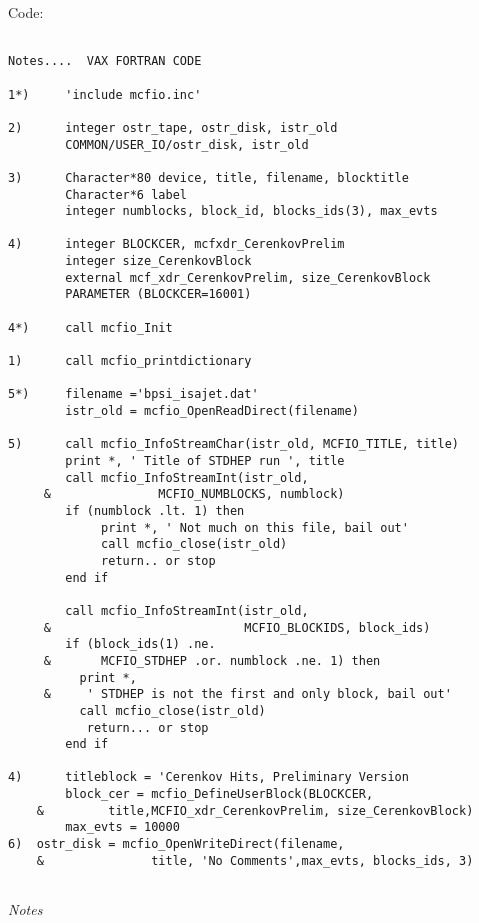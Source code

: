 \vspace{.1in} 
 Code:
\begin{verbatim}

Notes....  VAX FORTRAN CODE

1*) 	'include mcfio.inc'

2)      integer ostr_tape, ostr_disk, istr_old
        COMMON/USER_IO/ostr_disk, istr_old 
	
3)      Character*80 device, title, filename, blocktitle
        Character*6 label  
        integer numblocks, block_id, blocks_ids(3), max_evts
	
4)      integer BLOCKCER, mcfxdr_CerenkovPrelim
        integer size_CerenkovBlock 
        external mcf_xdr_CerenkovPrelim, size_CerenkovBlock
        PARAMETER (BLOCKCER=16001) 	
	
4*)     call mcfio_Init

1)      call mcfio_printdictionary

5*)     filename ='bpsi_isajet.dat'
        istr_old = mcfio_OpenReadDirect(filename)
	
5)      call mcfio_InfoStreamChar(istr_old, MCFIO_TITLE, title)
        print *, ' Title of STDHEP run ', title
        call mcfio_InfoStreamInt(istr_old, 
     &               MCFIO_NUMBLOCKS, numblock)
        if (numblock .lt. 1) then 
             print *, ' Not much on this file, bail out'
             call mcfio_close(istr_old)
             return.. or stop 
        end if
	
        call mcfio_InfoStreamInt(istr_old,
     &                           MCFIO_BLOCKIDS, block_ids)
        if (block_ids(1) .ne.
     &       MCFIO_STDHEP .or. numblock .ne. 1) then  
          print *,
     &     ' STDHEP is not the first and only block, bail out'
          call mcfio_close(istr_old)
           return... or stop 
        end if
		
4)      titleblock = 'Cerenkov Hits, Preliminary Version
        block_cer = mcfio_DefineUserBlock(BLOCKCER, 
    &         title,MCFIO_xdr_CerenkovPrelim, size_CerenkovBlock) 
        max_evts = 10000 	 
6)	ostr_disk = mcfio_OpenWriteDirect(filename, 
    &               title, 'No Comments',max_evts, blocks_ids, 3) 
	 
\end{verbatim}

\vspace{.1in}

{\em Notes}

\vspace{.1in}

